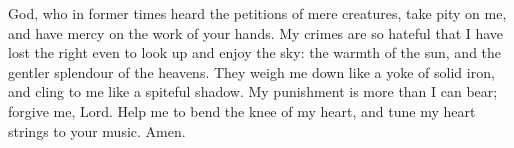 God, who in former times heard the petitions of mere creatures, take pity on me, and have mercy on the work of your hands. My crimes are so hateful that I have lost the right even to look up and enjoy the sky: the warmth of the sun, and the gentler splendour of the heavens. They weigh me down like a yoke of solid iron, and cling to me like a spiteful shadow. My punishment is more than I can bear; forgive me, Lord. Help me to bend the knee of my heart, and tune my heart strings to your music. Amen.
